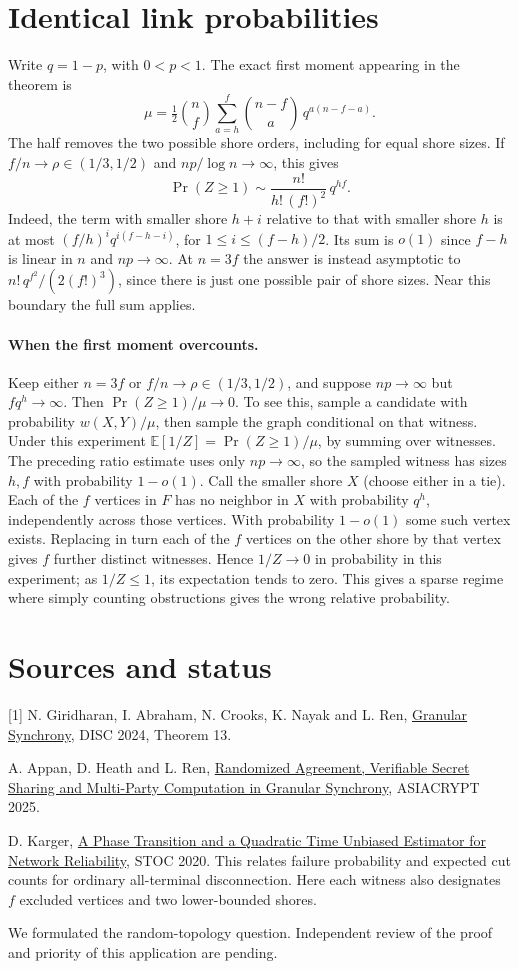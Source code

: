 \documentclass[11pt]{article}
\begin{document}
\section{Identical link probabilities}
Write $q=1-p$, with $0<p<1$. The exact first moment appearing in the theorem is
\[
  \mu=\tfrac12\binom nf
       \sum_{a=h}^{f}\binom{n-f}{a}\,q^{a(n-f-a)} .
\]
The half removes the two possible shore orders, including for equal shore sizes. If $f/n\to\rho\in(1/3,1/2)$ and $np/\log n\to\infty$, this gives
\[
  \Pr(Z\ge1)\sim\frac{n!}{h!\,(f!)^2}\,q^{hf}.
\]
Indeed, the term with smaller shore $h+i$ relative to that with smaller shore $h$ is at most
$(f/h)^i q^{i(f-h-i)}$, for $1\le i\le(f-h)/2$. Its sum is $o(1)$ since $f-h$ is linear in $n$ and $np\to\infty$. At $n=3f$ the answer is instead asymptotic to $n!\,q^{f^2}/(2(f!)^3)$, since there is just one possible pair of shore sizes. Near this boundary the full sum applies.

\paragraph{When the first moment overcounts.}
Keep either $n=3f$ or $f/n\to\rho\in(1/3,1/2)$, and suppose $np\to\infty$ but $f q^h\to\infty$. Then $\Pr(Z\ge1)/\mu\to0$. To see this, sample a candidate with probability $w(X,Y)/\mu$, then sample the graph conditional on that witness. Under this experiment $\mathbb E[1/Z]=\Pr(Z\ge1)/\mu$, by summing over witnesses. The preceding ratio estimate uses only $np\to\infty$, so the sampled witness has sizes $h,f$ with probability $1-o(1)$. Call the smaller shore $X$ (choose either in a tie). Each of the $f$ vertices in $F$ has no neighbor in $X$ with probability $q^h$, independently across those vertices. With probability $1-o(1)$ some such vertex exists. Replacing in turn each of the $f$ vertices on the other shore by that vertex gives $f$ further distinct witnesses. Hence $1/Z\to0$ in probability in this experiment; as $1/Z\le1$, its expectation tends to zero. This gives a sparse regime where simply counting obstructions gives the wrong relative probability.

\section*{Sources and status}
[1] N. Giridharan, I. Abraham, N. Crooks, K. Nayak and L. Ren, \href{https://doi.org/10.4230/LIPIcs.DISC.2024.30}{Granular Synchrony}, DISC 2024, Theorem 13.\par
[2] A. Appan, D. Heath and L. Ren, \href{https://eprint.iacr.org/2025/1327}{Randomized Agreement, Verifiable Secret Sharing and Multi-Party Computation in Granular Synchrony}, ASIACRYPT 2025.\par
[3] D. Karger, \href{https://people.csail.mit.edu/karger/Papers/lastrel-stoc.pdf}{A Phase Transition and a Quadratic Time Unbiased Estimator for Network Reliability}, STOC 2020. This relates failure probability and expected cut counts for ordinary all-terminal disconnection. Here each witness also designates $f$ excluded vertices and two lower-bounded shores.
\par\medskip
We formulated the random-topology question. Independent review of the proof and priority of this application are pending.
\end{document}

